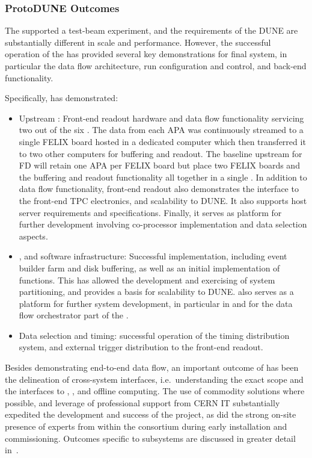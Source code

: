 \subsubsection{ProtoDUNE Outcomes}

The   supported a test-beam experiment, and the requirements of the DUNE  are substantially different in scale and performance.
However, the successful operation of the   has provided several key demonstrations for final system, in particular the data flow architecture, run configuration and control, and back-end functionality.

Specifically,  has demonstrated: 
\begin{itemize}
\item Upstream : Front-end readout hardware and data flow functionality servicing two out of the six .
  The data from each APA was continuously streamed to a single FELIX board hosted in a dedicated computer which then transferred it to two other computers for buffering and readout.
  The baseline upstream  for  FD will retain one APA per FELIX board but place two FELIX boards and the buffering and readout functionality all together in a single . 
  In addition to data flow functionality,  front-end readout also demonstrates the interface to the front-end TPC electronics, and scalability to DUNE. It also supports host server requirements and specifications. Finally, it serves as platform for further development involving co-processor implementation and data selection aspects.
\item {},  and software infrastructure:
 Successful  implementation, including event builder
  farm and disk buffering, as well as an initial implementation of  functions. This has allowed the
  development and exercising of system partitioning, and provides a
  basis for scalability to DUNE.  also serves as
  a platform for further system development, in particular in  and for the data flow orchestrator part of the
  .
\item Data selection and timing: successful operation of the timing
  distribution system, and external trigger distribution to the
  front-end readout.
\end{itemize}

Besides demonstrating end-to-end data flow, an important outcome of
 has been the delineation of cross-system
interfaces, i.e.~understanding the exact  scope and the interfaces to , , and offline computing. The use of commodity solutions
where possible, and leverage of professional support from CERN IT 
substantially expedited the development and success of the project, as
did the strong on-site presence of experts from within the consortium during early installation and
commissioning. 
Outcomes specific to  subsystems are discussed in
greater detail in~\cite{Hennessy:CDRReview}. 

